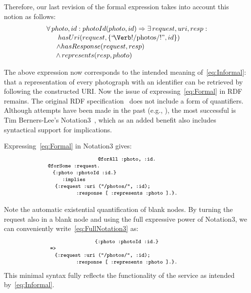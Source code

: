 \documentclass[runningheads,a4paper, twocolumn]{llncs}
\begin{document}
Therefore, our last revision of the formal expression takes into account this notion as follows:
\begin{multline}\label{eq:Formal}
	\makebox[7.8cm]{$\forall\, photo, id : photoId(photo, id) \Rightarrow
					\exists\, request, uri, resp :$}\\[-.2em]
	\shoveleft{hasUri(request, \{\mbox{``\!\Verb!/photos/!''}, id\})} \\[-.2em]
	\shoveleft{\land hasResponse(request, resp)} \\[-.2em]
	\land\, represents(resp, photo)\makebox[3.38cm]{}
\end{multline}

The above expression now corresponds to the intended meaning of~\ref{eq:Informal}: that a representation of every photograph with an identifier can be retrieved by following the constructed URI. Now the issue of expressing~\ref{eq:Formal} in RDF remains. The original RDF specification~\cite{RDF} does not include a form of quantifiers. Although attempts have been made in the past (e.g., \cite{RDFQuantifiers}), the most successful is Tim Berners-Lee's Notation3~\cite{Notation3}, which as an added benefit also includes syntactical support for implications.

Expressing~\ref{eq:Formal} in Notation3 gives:
\begin{multline}\label{eq:FullNotation3}
	\makebox[2.7cm]{\fontsize{8}{10}\texttt{@forAll :photo, :id.}}\\[-.5em]
	\fontsize{8}{10}\texttt{@forSome :request.}\makebox[5.47cm]{}\\[-.5em]
	\fontsize{8}{10}\texttt{\{:photo :photoId :id.\}}\makebox[4.37cm]{}\\[-.5em]
	\fontsize{8}{10}\texttt{:implies}\makebox[5.47cm]{}\\[-.5em]
	\fontsize{8}{10}\texttt{\{:request :uri ("/photos/", :id);}\makebox[2.5cm]{}\\[-.5em]
	\makebox[5.75cm]{\fontsize{8}{10}\texttt{:response [ :represents :photo ].\}.}}
\end{multline}

Note the automatic existential quantification of blank nodes. By turning the request also in a blank node and using the full expressive power of Notation3, we can conveniently write~\ref{eq:FullNotation3} as:
\begin{multline}\label{eq:Notation3}
	\makebox[3.44cm]{\fontsize{8}{10}\texttt{\{:photo :photoId :id.\}}}\\[-.5em]
	\fontsize{8}{10}\texttt{=>}\makebox[7.6cm]{}\\[-.5em]
	\fontsize{8}{10}\texttt{\{:request :uri ("/photos/", :id);}\makebox[2.5cm]{}\\[-.5em]
	\makebox[5.75cm]{\fontsize{8}{10}\texttt{:response [ :represents :photo ].\}.}}
\end{multline}
This minimal syntax fully reflects the functionality of the service as intended by~\ref{eq:Informal}.
\end{document}
